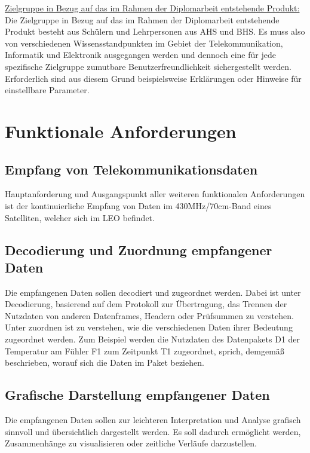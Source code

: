 \underline{Zielgruppe in Bezug auf das im Rahmen der Diplomarbeit entstehende Produkt: }\\
Die Zielgruppe in Bezug auf das im Rahmen der Diplomarbeit entstehende Produkt besteht aus Schülern und Lehrpersonen aus AHS und BHS. Es muss also von verschiedenen Wissensstandpunkten im Gebiet der Telekommunikation, Informatik und Elektronik ausgegangen werden und dennoch eine für jede spezifische Zielgruppe zumutbare Benutzerfreundlichkeit sichergestellt werden. Erforderlich sind aus diesem Grund beispielsweise Erklärungen oder Hinweise für einstellbare Parameter. 

\section{Funktionale Anforderungen}
\subsection{Empfang von Telekommunikationsdaten}
Hauptanforderung und Ausgangspunkt aller weiteren funktionalen Anforderungen ist der 
kontinuierliche Empfang von Daten im 430MHz/70cm-Band eines Satelliten, welcher sich im LEO 
befindet.\\

\subsection{Decodierung und Zuordnung empfangener Daten}
Die empfangenen Daten sollen decodiert und zugeordnet werden. Dabei ist unter Decodierung, basierend auf dem Protokoll zur Übertragung, das Trennen der Nutzdaten von anderen Datenframes, Headern oder Prüfsummen zu verstehen. Unter zuordnen ist zu verstehen, wie die verschiedenen Daten ihrer Bedeutung zugeordnet werden. Zum Beispiel werden die Nutzdaten des Datenpakets D1 der Temperatur am Fühler F1 zum Zeitpunkt T1 zugeordnet, sprich, demgemäß beschrieben, worauf sich die Daten im Paket beziehen.\\

\subsection{Grafische Darstellung empfangener Daten}
Die empfangenen Daten sollen zur leichteren Interpretation und Analyse grafisch sinnvoll und übersichtlich dargestellt werden. Es soll dadurch ermöglicht werden, Zusammenhänge zu visualisieren oder zeitliche Verläufe darzustellen.\\

